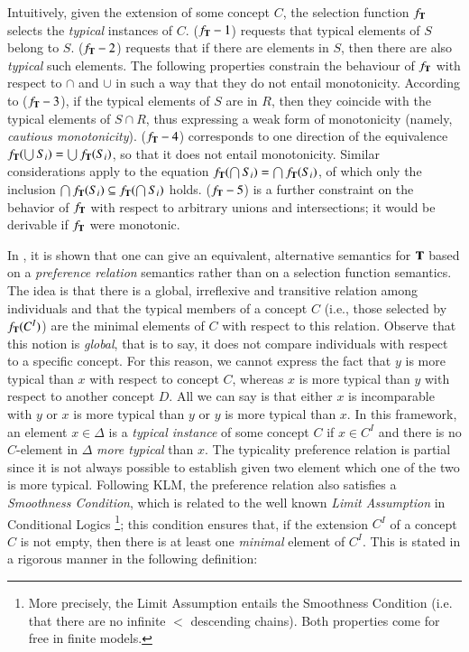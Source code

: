 \documentclass[a4paper, 11pt, oneside]{elsarticle}
\newcommand{\tip}{{\bf T}}
\newcommand{\incluso} {\subseteq}
\begin{document}
\noindent Intuitively, given the extension of some concept $C$, the selection function $f_\tip$ selects  the {\em typical} instances of $C$.
($f_\tip-1$) requests that typical elements of $S$ belong to $S$.
($f_\tip-2$) requests that if there are elements in $S$, then there are also {\em typical} such elements.
The following properties constrain the behaviour of $f_\tip$ with respect to $\cap$ and $\cup$ in such a way that they do not entail monotonicity.
According to ($f_\tip-3$), if the typical elements of $S$ are in $R$, then they coincide with the typical elements of $S \cap R$, thus expressing a weak form of monotonicity (namely, {\em cautious monotonicity}).
($f_\tip-4$) corresponds to one direction of the equivalence $f_\tip(\bigcup S_i) = \bigcup f_\tip(S_i)$, so that it does not entail monotonicity.
Similar considerations apply to the equation $f_\tip(\bigcap S_i) = \bigcap f_\tip(S_i)$, of which only the inclusion $\bigcap f_\tip(S_i) \incluso f_\tip(\bigcap S_i)$ holds. ($f_\tip-5$) is a further constraint on the behavior of $f_\tip$ with respect to arbitrary unions and intersections; it would be derivable if $f_\tip$ were monotonic.

In \cite{FI09}, it is shown that one can give an equivalent, alternative semantics for $\tip$ based on a \emph{preference relation} semantics rather than on a selection function semantics.
The idea is that there is a global, irreflexive and transitive relation among individuals and that the typical members of a concept $C$ (i.e., those selected by $f_\tip(C^I)$) are the minimal elements of $C$ with respect to this relation.
Observe that this notion is \emph{global}, that is to say, it does not compare individuals with respect to a specific concept.
For this reason,  we cannot express the fact that $y$ is more typical than $x$ with respect to concept $C$, whereas $x$ is more typical than $y$ with respect to another concept $D$.
All we can say is that either $x$ is incomparable with $y$ or $x$ is more typical than $y$ or $y$ is more typical than $x$.
In this framework, an element $x \in \Delta$ is a {\em typical instance} of some concept $C$ if $x \in C^I$ and there is no $C$-element in $\Delta$ {\em more typical} than $x$.
The typicality preference relation is partial since it is not always possible to establish given two element which one of the two is more typical.
Following KLM, the preference relation also satisfies a \emph{Smoothness Condition}, which is related to the well known \emph{Limit Assumption} in Conditional Logics \cite{Nute80}
\footnote{More precisely, the Limit Assumption entails the Smoothness Condition (i.e. that there are no infinite $<$ descending chains). Both properties come for free in finite models.};
this condition ensures that, if the extension $C^I$ of a concept $C$ is not empty, then there is at least one \emph{minimal} element of $C^I$.
This is stated in a rigorous manner in the following definition:
\end{document}
